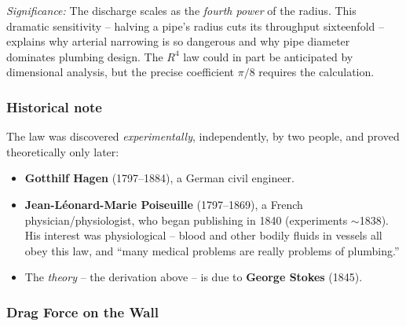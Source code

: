 \documentclass[../main.tex]{subfiles}
\begin{document}
\textit{Significance:} The discharge scales as the \emph{fourth power} of the radius. This dramatic sensitivity -- halving a pipe's radius cuts its throughput sixteenfold -- explains why arterial narrowing is so dangerous and why pipe diameter dominates plumbing design. The $R^4$ law could in part be anticipated by dimensional analysis, but the precise coefficient $\pi/8$ requires the calculation.


\subsubsection*{Historical note}
The law was discovered \emph{experimentally}, independently, by two people, and proved theoretically only later:
\begin{itemize}
  \item \textbf{Gotthilf Hagen} (1797--1884), a German civil engineer.
  \item \textbf{Jean-Léonard-Marie Poiseuille} (1797--1869), a French physician/physiologist, who began publishing in 1840 (experiments $\sim$1838). His interest was physiological -- blood and other bodily fluids in vessels all obey this law, and ``many medical problems are really problems of plumbing.''
  \item The \emph{theory} -- the derivation above -- is due to \textbf{George Stokes} (1845).
\end{itemize}

\subsubsection{Drag Force on the Wall}\label{sec:lec20:drag}
\end{document}
